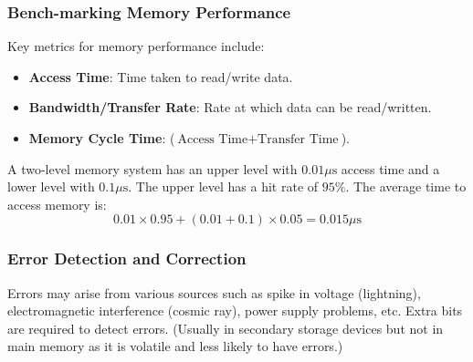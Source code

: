 \subsubsection{Bench-marking Memory Performance}

Key metrics for memory performance include:
\begin{itemize}
    \item \textbf{Access Time}: Time taken to read/write data.
    \item \textbf{Bandwidth/Transfer Rate}: Rate at which data can be read/written.
    \item \textbf{Memory Cycle Time}: ($\text{Access Time} + \text{Transfer Time}$).
\end{itemize}

\begin{example}
    A two-level memory system has an upper level with $0.01\mu \text{s}$ access time and
    a lower level with $0.1\mu \text{s}$. The upper level has a hit rate of $95\%$. The
    average time to access memory is:
    \begin{equation*}
        0.01 \times 0.95 + (0.01 + 0.1) \times 0.05 = 0.015\mu \text{s}
    \end{equation*}
\end{example}

\subsubsection{Error Detection and Correction}

Errors may arise from various sources such as spike in voltage (lightning), electromagnetic
interference (cosmic ray), power supply problems, etc. Extra bits are required to detect errors.
(Usually in secondary storage devices but not in main memory as it is volatile and less likely
to have errors.)

